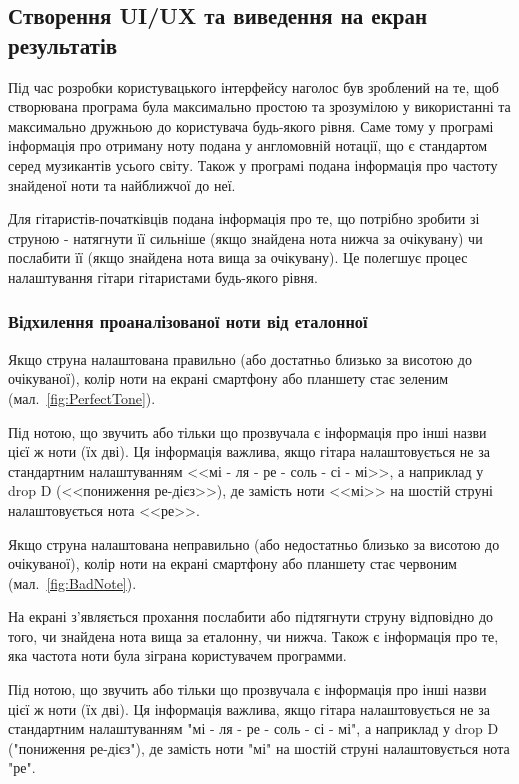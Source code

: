 \subsection{Створення UI/UX та виведення на екран результатів}

Під час розробки користувацького інтерфейсу наголос був зроблений на те, щоб створювана програма була максимально простою та зрозумілою у використанні та максимально дружньою до користувача будь-якого рівня. Саме тому у програмі інформація про отриману ноту подана у англомовній нотації, що є стандартом серед музикантів усього світу. Також у програмі подана інформація про частоту знайденої ноти та найближчої до неї.

Для гітаристів-початківців подана інформація про те, що потрібно зробити зі струною - натягнути її сильніше (якщо знайдена нота нижча за очікувану) чи послабити її (якщо знайдена нота вища за очікувану). Це полегшує процес налаштування гітари гітаристами будь-якого рівня.


\subsubsection{Відхилення проаналізованої ноти від еталонної}

Якщо струна налаштована правильно (або достатньо близько за висотою до очікуваної), колір ноти на екрані смартфону або планшету стає зеленим (мал.~\ref{fig:PerfectTone}). 

Під нотою, що звучить або тільки що прозвучала є інформація про інші назви цієї ж ноти (їх дві). Ця інформація важлива, якщо гітара налаштовується не за стандартним налаштуванням <<мі - ля - ре - соль - сі - мі>>, а наприклад у drop D (<<пониження ре-дієз>>), де замість ноти <<мі>> на шостій струні налаштовується нота <<ре>>.

Якщо струна налаштована неправильно (або недостатньо близько за висотою до очікуваної), колір ноти на екрані смартфону або планшету стає червоним (мал.~\ref{fig:BadNote}).

На екрані з'являється прохання послабити або підтягнути струну відповідно до того, чи знайдена нота вища за еталонну, чи нижча. Також є інформація про те, яка частота ноти була зіграна користувачем программи.

Під нотою, що звучить або тільки що прозвучала є інформація про інші назви цієї ж ноти (їх дві). Ця інформація важлива, якщо гітара налаштовується не за стандартним налаштуванням "мі - ля - ре - соль - сі - мі", а наприклад у drop D ("пониження ре-дієз"), де замість ноти "мі" на шостій струні налаштовується нота "ре".

